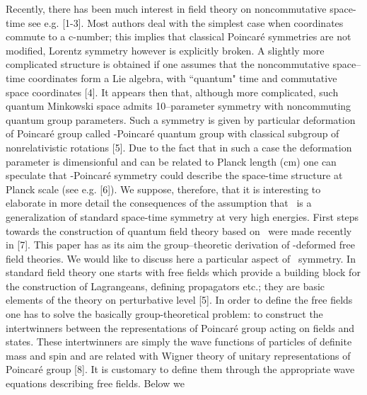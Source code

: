 \documentclass[a4paper,a4paper]{article}
\begin{document}
Recently, there has been much interest in field theory on
noncommutative space-time  see e.g. [1-3]. Most authors deal with
the simplest case when coordinates commute to a c-number; this
implies that
 classical Poincar\'{e} symmetries are not modified,
 Lorentz symmetry however is explicitly broken. A slightly
more complicated structure is obtained if one assumes that the
 noncommutative space--time coordinates form a Lie algebra,
  with ``quantum" time
 and commutative space   coordinates [4]. It appears then that,
although
more complicated, such quantum Minkowski space admits
10--parameter
symmetry  with  noncommuting quantum group parameters.
Such a symmetry  is given by particular   deformation of Poincar\'{e} group called \myHighlight{$\kappa$}\coordHE{}%
-Poincar\'{e} quantum group \coordHE{} with classical subgroup
of
 nonrelativistic \coordHE{} rotations [5]. Due to the fact
that in such a case the
deformation parameter is  dimensionful
 and can be related to Planck length (\coordHE{}cm)
 one can speculate that
\myHighlight{$\kappa$}\coordHE{}%
-Poincar\'{e}  symmetry could describe the space-time structure
at Planck scale  (see e.g. [6]). We suppose, therefore, that it
  is interesting to elaborate in
more detail the consequences of the assumption  that
\coordHE{}\ is a generalization of standard space-time symmetry
at very high energies. First steps towards the construction of
quantum field theory based on \coordHE{}\ were made recently in
[7]. This paper has as its aim the group--theoretic derivation of
\myHighlight{$\kappa$}\coordHE{}-deformed
 free field theories.
\newline
We would like to discuss here a particular  aspect of
\coordHE{}\ symmetry. In standard field  theory one starts with
free fields which provide a building block for the construction of
Lagrangeans,  defining propagators etc.; they are basic elements
of the theory on perturbative level [5]. In order to define the
free fields one has to solve the basically group-theoretical
problem: to construct the intertwinners between the
representations of Poincar\'{e} group acting on fields  and
states. These intertwinners are simply the wave functions of
particles of definite mass and spin and are related with Wigner
theory of unitary representations of Poincar\'{e} group [8]. It is
customary to define them through the appropriate wave equations
describing free fields.
\newline Below we
\end{document}
